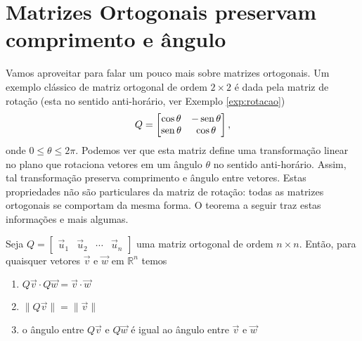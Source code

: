 \documentclass[../livro.tex]{subfiles}  %
\begin{document}
\section{Matrizes Ortogonais preservam comprimento e ângulo}

Vamos aproveitar para falar um pouco mais sobre matrizes ortogonais. Um exemplo clássico de matriz ortogonal de ordem $2\times 2$ é dada pela matriz de rotação (esta no sentido anti-horário, ver Exemplo \ref{exp:rotacao})
\[
Q =
\begin{bmatrix}
\cos \theta & -\operatorname{sen} \theta \\
\operatorname{sen} \theta & \cos \theta
\end{bmatrix} ,\]
onde $0 \leq \theta \leq 2 \pi$.
Podemos ver que esta matriz define uma transformação linear no plano que rotaciona vetores em um ângulo $\theta$ no sentido anti-horário.
Assim, tal transformação preserva comprimento e ângulo entre vetores.
Estas propriedades não são particulares da matriz de rotação: todas as matrizes ortogonais se comportam da mesma forma. O teorema a seguir traz estas informações e mais algumas.

\begin{theorem}
	Seja $Q= \begin{bmatrix}
	\vec{u}_1 & \vec{u}_2 & \cdots & \vec{u}_n
	\end{bmatrix}$ uma matriz ortogonal de ordem $n \times n$. Então, para quaisquer vetores $\vec{v}$ e $\vec{w}$ em $\mathbb{R}^n$ temos
	\begin{enumerate}[$(i)$]
		\item $Q\vec{v} \cdot Q\vec{w} = \vec{v} \cdot  \vec{w}$
		\item  $\| Q\vec{v} \| = \| \vec{v} \|$
		\item  o ângulo entre $Q\vec{v}$ e $Q\vec{w}$ é igual ao  ângulo entre $\vec{v}$ e $\vec{w}$
		\end{enumerate}
\end{theorem}
\end{document}
